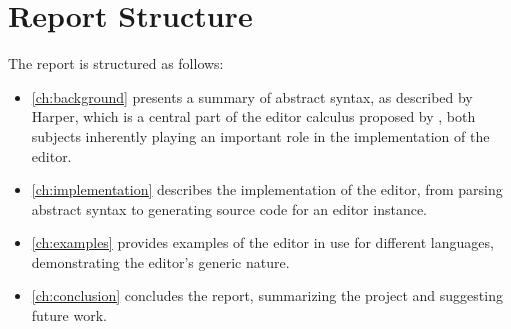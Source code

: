 \section{Report Structure}
The report is structured as follows:

\begin{itemize}
    \item \cref{ch:background} presents a summary of abstract syntax, as described by Harper\cite{harper}, which is a central part of the editor calculus proposed by \cite{aalborg}, both
          subjects inherently playing an important role in the implementation of the editor.
    \item \cref{ch:implementation} describes the implementation of the editor, from parsing abstract syntax to generating source code for an editor instance.
    \item \cref{ch:examples} provides examples of the editor in use for different languages, demonstrating the editor's generic nature.
    \item \cref{ch:conclusion} concludes the report, summarizing the project and suggesting future work.
\end{itemize}